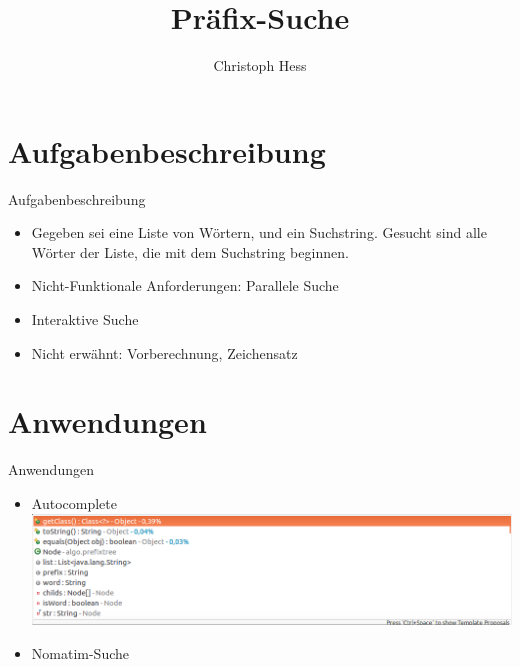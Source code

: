 \documentclass[11pt, xcolor=dvipsnames]{beamer}
\title{Präfix-Suche}
\author{Christoph Hess}
\begin{document}
	\maketitle
	
	\section{Aufgabenbeschreibung}
	\begin{frame}{Aufgabenbeschreibung}
		\begin{itemize}
			\item Gegeben sei eine Liste von Wörtern, und ein Suchstring. Gesucht sind alle Wörter der Liste, die mit dem Suchstring beginnen.
			
			\item Nicht-Funktionale Anforderungen: Parallele Suche
			\item Interaktive Suche
			\item Nicht erwähnt: Vorberechnung, Zeichensatz
		\end{itemize}
	\end{frame}
	\section{Anwendungen}
	\begin{frame}{Anwendungen}
		\begin{itemize}
			\item Autocomplete
			\includegraphics[scale=0.3]{pics/autocomplete.png}
			\item Nomatim-Suche
			
		\end{itemize}
	\end{frame}
\end{document}
